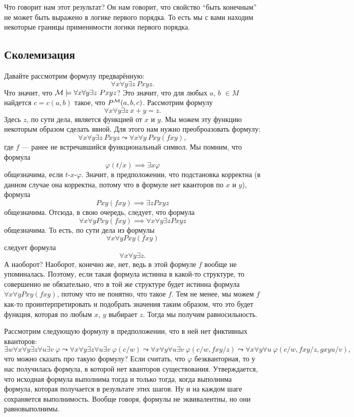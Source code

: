 Что говорит нам этот результат?
Он нам говорит, что свойство \enquote{быть конечным} не может быть выражено в логике первого порядка.
То есть мы с вами находим некоторые границы применимости логики первого порядка.

\subsection{Сколемизация}

Давайте рассмотрим формулу предварённую:
$$
    \forall x \forall y \exists z~ Pxyz.
$$
Что значит, что $\mathcal{M} \models \forall x \forall y \exists z~Pxyz$?
Это значит, что для любых $a$, $b$ $\in M$ найдется $c = c(a, b)$ такое, что $P^{\mathcal{M}}(a, b, c)$.
Рассмотрим формулу
$$
    \forall x \forall y \exists z~ x + y = z.
$$
Здесь $z$, по сути дела, является функцией от $x$ и $y$.
Мы можем эту функцию некоторым образом сделать явной.
Для этого нам нужно преоброазовать формулу:
$$
    \forall x \forall y \exists z~ Pxyz \leadsto \forall x \forall y~ Pxy(fxy),
$$
где $f$ --- ранее не встречавшийся функциональный символ.
Мы помним, что формула
$$
    \varphi(t/x) \implies \exists x \varphi
$$
общезначима, если $t$-$x$-$\varphi$.
Значит, в предположении, что подстановка корректна (в данном случае она корректна, потому что в формуле нет кванторов по $x$ и $y$), формула
$$
    Pxy(fxy) \implies \exists z Pxyz
$$
общезначима.
Отсюда, в свою очередь, следует, что формула
$$
    \forall x \forall y Pxy(fxy) \implies \forall x \forall y \exists z Pxyz
$$
общезначима.
То есть, по сути дела из формулы
$$
    \forall x \forall y Pxy(fxy)
$$
следует формула
$$
    \forall x \forall y \exists z.
$$
А наоборот?
Наоборот, конечно же, нет, ведь в этой формуле $f$ вообще не упоминалась.
Поэтому, если такая формула истинна в какой-то структуре, то совершенно не обязательно, что в той же структуре будет истинна формула $\forall x \forall y Pxy(fxy)$, потому что не понятно, что такое $f$.
Тем не менее, мы можем $f$ как-то проинтерпретировать и подобрать значения таким образом, что это будет функция, которая по любым $x$, $y$ выбирает $z$.
Тогда мы получим равносильность.

Рассмотрим следующую формулу в предположении, что в ней нет фиктивных кванторов:
$$
    \exists w \forall x \forall y \exists z \forall u \exists v~\varphi \leadsto \forall x \forall y \exists z \forall u \exists v~\varphi(c/w) \leadsto \forall x \forall y  \forall u \exists v~\varphi(c/w, fxy/z) \leadsto \forall x \forall y \forall u~\varphi(c/w, fxy/z, gxyu/v),
$$
что можно сказать про такую формулу?
Если считать, что $\varphi$ безкванторная, то у нас получилась формула, в которой нет кванторов существования.
Утверждается, что исходная формула выполнима тогда и только тогда, когда выполнима формула, которая получается в результате этих шагов.
Ну и на каждом шаге сохраняется выполнимость.
Вообще говоря, формулы не эквивалентны, но они равновыполнимы.

